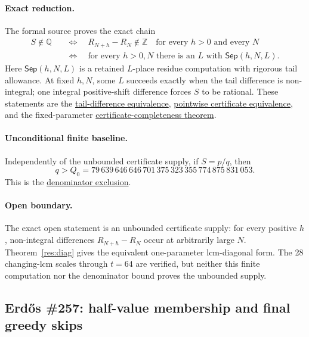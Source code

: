\documentclass[11pt]{article}
\newcommand{\commit}{312b96c0d149ed466725c62d4ef24cfc91bca34e}
\newcommand{\repobase}{https://github.com/wcook04/plectis-lean-erdos249-257/blob/\commit}
\newcommand{\PK}{Erdos249257}
\newcommand{\lword}[4]{\href{\repobase/\PK/#1\#L#2}{#4}}
\theoremstyle{definition}
\theoremstyle{remark}
\newcommand{\Z}{\mathbb{Z}}
\newcommand{\Q}{\mathbb{Q}}
\newcommand{\Qzero}{Q_0}
\begin{document}
\paragraph{Exact reduction.}
The formal source proves the exact chain
\[
\begin{split}
 S\notin\Q
 &\quad\Longleftrightarrow\quad
   R_{N+h}-R_N\notin\Z
   \quad\text{for every }h>0\text{ and every }N\\
 &\quad\Longleftrightarrow\quad
   \text{for every }h>0,N\text{ there is an }L
   \text{ with }\mathsf{Sep}(h,N,L).
\end{split}
\]
Here \(\mathsf{Sep}(h,N,L)\) is a retained \(L\)-place residue computation
with rigorous tail allowance.  At fixed \(h,N\), some \(L\) succeeds exactly
when the tail difference is non-integral; one integral positive-shift
difference forces \(S\) to be rational.  These statements are the
\lword{LcmConeFlatness.lean}{386}{irrational_totient_series_iff_all_tail_diffs_nonintegral}{tail-difference equivalence},
\lword{LcmConeFlatness.lean}{399}{irrational_totient_series_iff_pointwise_certificates}{pointwise certificate equivalence},
and the fixed-parameter
\lword{LcmConeFlatness.lean}{316}{exists_certifiedKill_iff_tail_diff_notMem_int}{certificate-completeness theorem}.

\paragraph{Unconditional finite baseline.}
Independently of the unbounded certificate supply, if \(S=p/q\), then
\[
 q>\Qzero
 =79\,639\,646\,646\,701\,375\,323\,355\,774\,875\,831\,053.
\]
This is the \lword{CertificateKernel.lean}{18056}{tsum_totient_div_pow_two_ne_ratCast_of_den_le_79639646646701375323355774875831053}{denominator exclusion}.

\paragraph{Open boundary.}
The exact open statement is an unbounded certificate supply: for every
positive \(h\), non-integral differences \(R_{N+h}-R_N\) occur at
arbitrarily large \(N\).  Theorem~\ref{res:diag} gives the equivalent
one-parameter lcm-diagonal form.  The 28 changing-lcm scales through
\(t=64\) are verified, but neither this finite computation nor the
denominator bound proves the unbounded supply.

\subsection{Erd\H{o}s \#257: half-value membership and final greedy skips}
\label{res:halfstory}
\end{document}
